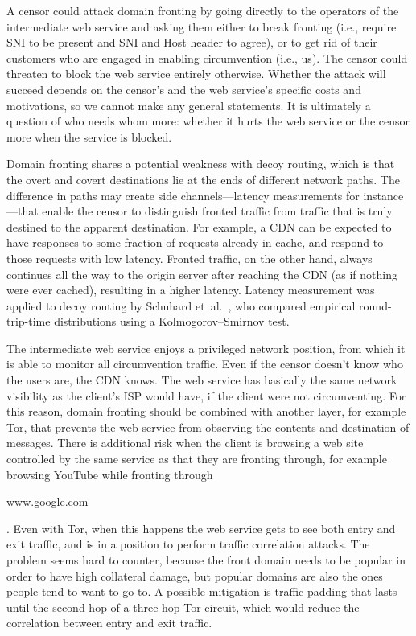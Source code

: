 \documentclass[conference]{IEEEtran}
\def\urll#1{\begin{NoHyper}\url{#1}\end{NoHyper}}
\begin{document}
A censor could attack domain fronting by
going directly to the operators of the intermediate web service
and asking them either to break fronting
(i.e., require SNI to be present and SNI and Host header to agree),
or to get rid of their customers who are
engaged in enabling circumvention (i.e., us).
The censor could threaten to block the web service entirely otherwise.
Whether the attack will succeed depends on the censor's
and the web service's specific costs and motivations,
so we cannot make any general statements.
It is ultimately a question of who needs whom more:
whether it hurts the web service or the censor more
when the service is blocked.

Domain fronting shares a potential weakness with decoy routing,
which is that the overt and covert destinations lie at the ends of different
network paths.
The difference in paths may create side channels---latency measurements for instance---that
enable the censor to
distinguish fronted traffic from traffic that is truly destined
to the apparent destination.
For example, a CDN can be expected to have responses
to some fraction of requests already in cache,
and respond to those requests with low latency.
Fronted traffic, on the other hand, always continues all the way
to the origin server after reaching the CDN (as if nothing were ever cached),
resulting in a higher latency.
Latency measurement was applied to decoy routing by Schuhard et~al.~\cite[Section~5]{ccs2012-decoys},
who compared empirical round-trip-time distributions using a
Kolmogorov--Smirnov test.

The intermediate web service enjoys a privileged network position,
from which it is able to monitor all circumvention traffic.
Even if the censor doesn't know who the users are, the CDN knows.
The web service has basically the same network visibility
as the client's ISP would have, if the client were not circumventing.
For this reason, domain fronting should be combined with another
layer, for example Tor, that prevents the web service from
observing the contents and destination of messages.
There is additional risk when the client is browsing a web site
controlled by the same service as that they are fronting through,
for example browsing YouTube while fronting through \urll{www.google.com}.
Even with Tor, when this happens the web service gets to see
both entry and exit traffic, and is in a position to
perform traffic correlation attacks.
The problem seems hard to counter, because the front domain needs
to be popular in order to have high collateral damage,
but popular domains are also the ones people tend to want to go to.
A possible mitigation is traffic padding that lasts until
the second hop of a three-hop Tor circuit,
which would reduce the correlation between entry and exit traffic.
\end{document}
